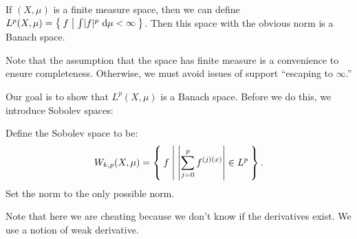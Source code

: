 \documentclass[10pt, twoside]{article}
\renewcommand{\d}{\ \mathrm{d}}
\begin{document}
    \begin{exm}
        If $(X, \mu)$ is a finite measure space, then we can define $L^p(X, \mu) = \Set{f | \int \abs{f}^p \d \mu < \infty}$. Then this space with the obvious norm is a Banach space.

        Note that the assumption that the space has finite measure is a convenience to ensure completeness. Otherwise, we must avoid issues of support ``escaping to $\infty$.''
    \end{exm}

    Our goal is to show that $L^p(X, \mu)$ is a Banach space. Before we do this, we introduce Sobolev spaces:

    \begin{defn}
        Define the Sobolev space to be:
        \[W_{k,p}(X,\mu) = \Set{f | \abs*{\sum_{j=0}^p f^{(j)(x)}} \in L^p}.\]
        Set the norm to the only possible norm.

        Note that here we are cheating because we don't know if the derivatives exist. We use a notion of weak derivative.
    \end{defn}
\end{document}
